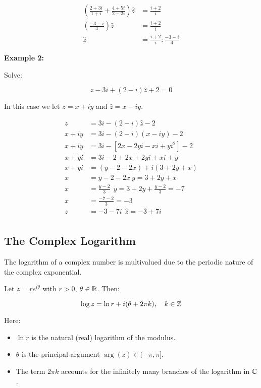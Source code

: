 \begin{align*}
	\left( \frac{2 + 3i}{1 + i} + \frac{4 + 5i}{2 - 2i}\right) \hat{z} &= \frac{i + 2}{i}\\
	\left( \frac{-3 -i}{4} \right) \hat{z} &= \frac{i + 2}{i}\\
	\hat{z} &= \frac{i + 2}{i} : \frac{-3 -i}{4}
\end{align*}

\textbf{Example 2:}
\vspace{\baselineskip}

Solve:

\[
	z - 3i + (2 -i)\hat{z} + 2 = 0
\]

In this case we let \( z = x + iy \) and \( \hat{z} = x - iy \).

\begin{align*}
	z &= 3i - (2 - i)\hat{z} - 2\\
	x + iy &= 3i - (2 - i)(x - iy) - 2\\
	x + iy &= 3i - [2x - 2yi -xi +yi^2] - 2\\
	x + yi &= 3i - 2 + 2x + 2yi + xi + y\\
	x + yi &= (y - 2 -2x) + i(3 + 2y + x)\\
	x &= y - 2 -2x\ y = 3 + 2y + x\\
	x &= \frac{y - 2}{3}\ \ y = 3 + 2y + \frac{y-2}{3} = -7\\
	x &= \frac{-7 -2}{3} = -3\\
	z &= -3 -7i\ \ \hat{z} = -3 + 7i\\
\end{align*}

\subsection{The Complex Logarithm}

The logarithm of a complex number is multivalued due to the periodic nature of the complex exponential.

Let \( z = re^{i\theta} \) with \( r > 0 \), \( \theta \in \mathbb{R} \). Then:

\[
	\log z = \ln r + i(\theta + 2\pi k), \quad k \in \mathbb{Z}
\]

Here:

\begin{itemize}
	\item \( \ln r \) is the natural (real) logarithm of the modulus.
	\item \( \theta \) is the principal argument \( \arg(z) \in (-\pi, \pi] \).
	\item The term \( 2\pi k \) accounts for the infinitely many branches of the logarithm in \( \mathbb{C} \).
\end{itemize}

